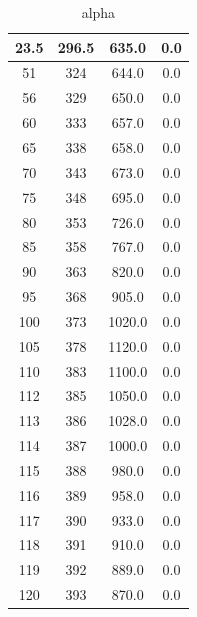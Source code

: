 \documentclass{double}
\begin{document}
\begin{table}[H]
{\begin{tabular}{|c|c|c|c|}
23.5 & 296.5 & 635.0 & 0.0\\\hline
51 & 324 & 644.0 & 0.0\\\hline
56 & 329 & 650.0 & 0.0\\\hline
60 & 333 & 657.0 & 0.0\\\hline
65 & 338 & 658.0 & 0.0\\\hline
70 & 343 & 673.0 & 0.0\\\hline
75 & 348 & 695.0 & 0.0\\\hline
80 & 353 & 726.0 & 0.0\\\hline
85 & 358 & 767.0 & 0.0\\\hline
90 & 363 & 820.0 & 0.0\\\hline
95 & 368 & 905.0 & 0.0\\\hline
100 & 373 & 1020.0 & 0.0\\\hline
105 & 378 & 1120.0 & 0.0\\\hline
110 & 383 & 1100.0 & 0.0\\\hline
112 & 385 & 1050.0 & 0.0\\\hline
113 & 386 & 1028.0 & 0.0\\\hline
114 & 387 & 1000.0 & 0.0\\\hline
115 & 388 & 980.0 & 0.0\\\hline
116 & 389 & 958.0 & 0.0\\\hline
117 & 390 & 933.0 & 0.0\\\hline
118 & 391 & 910.0 & 0.0\\\hline
119 & 392 & 889.0 & 0.0\\\hline
120 & 393 & 870.0 & 0.0\\\hline
\end{tabular}}
\caption{alpha}
\label{t:alpha}\end{table}\begin{table}[H]
\centering{}
\end{table}
\end{document}
